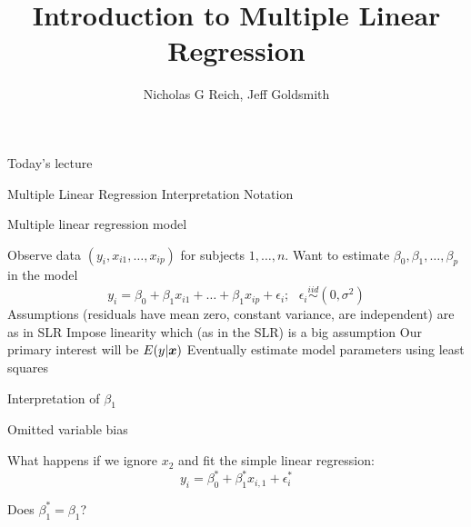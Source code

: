 \documentclass[table]{beamer}\usepackage[]{graphicx}\usepackage[]{color}
\title{Introduction to Multiple Linear Regression}
\author{Nicholas G Reich, Jeff Goldsmith}
\begin{document}
\begin{frame}[plain]
	\titlepage
\end{frame}








\begin{frame}{Today's lecture}

\bi
        \myitem Multiple Linear Regression 
	\bi
		\myitem Interpretation
		\myitem Notation
	\ei
\ei

\end{frame}






\begin{frame}{Multiple linear regression model}

\bi
	\myitem Observe data $(y_i, x_{i1}, \ldots, x_{ip})$ for subjects $1, \ldots, n$. Want to estimate $\beta_0, \beta_1, \ldots, \beta_p$ in the model
	$$ y_i = \beta_0 + \beta_1x_{i1} + \ldots + \beta_1x_{ip} + \epsilon_i; \mbox{ } \epsilon_i \stackrel{iid}{\sim} (0,\sigma^2)$$
	\myitem Assumptions (residuals have mean zero, constant variance, are independent) are as in SLR
	\myitem Impose linearity which (as in the SLR) is a big assumption
	\myitem Our primary interest will be $E(y | \boldsymbol{x})$
	\myitem Eventually estimate model parameters using least squares
\ei

\end{frame}




\begin{frame}[t]{Interpretation of $\beta_1$}


\end{frame}




\begin{frame}{Omitted variable bias}

What happens if we ignore $x_2$ and fit the simple linear regression:
$$ y_i = \beta^{*}_0 + \beta^{*}_1 x_{i,1} + \epsilon^{*}_i$$

Does $\beta^{*}_1 = \beta_{1}$? 

\end{frame}
\end{document}
